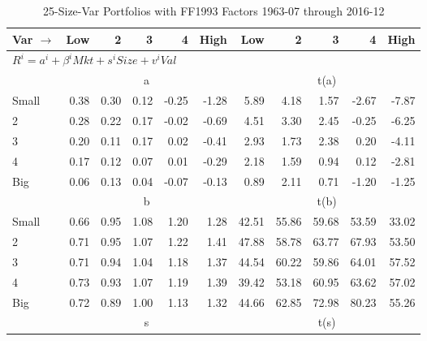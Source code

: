
\begin{table}[!ht]
\centering
\caption{25-Size-Var Portfolios with FF1993 Factors 1963-07 through 2016-12}
\begin{tabular}{lrrrrrrrrrr}
  \toprule
    Var $\rightarrow$ & Low & 2 & 3 & 4 & High & Low & 2 & 3 & 4 & High \\ 
  \midrule
  \multicolumn{11}{l}{$R^i=a^i+\beta^iMkt+s^iSize+v^iVal$} \\

  
    
      & \multicolumn{5}{c}{a} & \multicolumn{5}{c}{t(a)}
    
    \\
      \cmidrule(r){2-6} \cmidrule(r){7-11}

    Small   & 0.38  & 0.30  & 0.12  & -0.25  & -1.28  & 5.89  & 4.18  & 1.57  & -2.67  & -7.87  \\
         2  & 0.28  & 0.22  & 0.17  & -0.02  & -0.69  & 4.51  & 3.30  & 2.45  & -0.25  & -6.25  \\
         3  & 0.20  & 0.11  & 0.17  & 0.02  & -0.41  & 2.93  & 1.73  & 2.38  & 0.20  & -4.11  \\
         4  & 0.17  & 0.12  & 0.07  & 0.01  & -0.29  & 2.18  & 1.59  & 0.94  & 0.12  & -2.81  \\
    Big     & 0.06  & 0.13  & 0.04  & -0.07  & -0.13  & 0.89  & 2.11  & 0.71  & -1.20  & -1.25  \\

  
    
      & \multicolumn{5}{c}{b} & \multicolumn{5}{c}{t(b)}
    
    \\
      \cmidrule(r){2-6} \cmidrule(r){7-11}

    Small   & 0.66  & 0.95  & 1.08  & 1.20  & 1.28  & 42.51  & 55.86  & 59.68  & 53.59  & 33.02  \\
         2  & 0.71  & 0.95  & 1.07  & 1.22  & 1.41  & 47.88  & 58.78  & 63.77  & 67.93  & 53.50  \\
         3  & 0.71  & 0.94  & 1.04  & 1.18  & 1.37  & 44.54  & 60.22  & 59.86  & 64.01  & 57.52  \\
         4  & 0.73  & 0.93  & 1.07  & 1.19  & 1.39  & 39.42  & 53.18  & 60.95  & 63.62  & 57.02  \\
    Big     & 0.72  & 0.89  & 1.00  & 1.13  & 1.32  & 44.66  & 62.85  & 72.98  & 80.23  & 55.26  \\

  
    
      & \multicolumn{5}{c}{s} & \multicolumn{5}{c}{t(s)}
    

\end{tabular}
\end{table}
